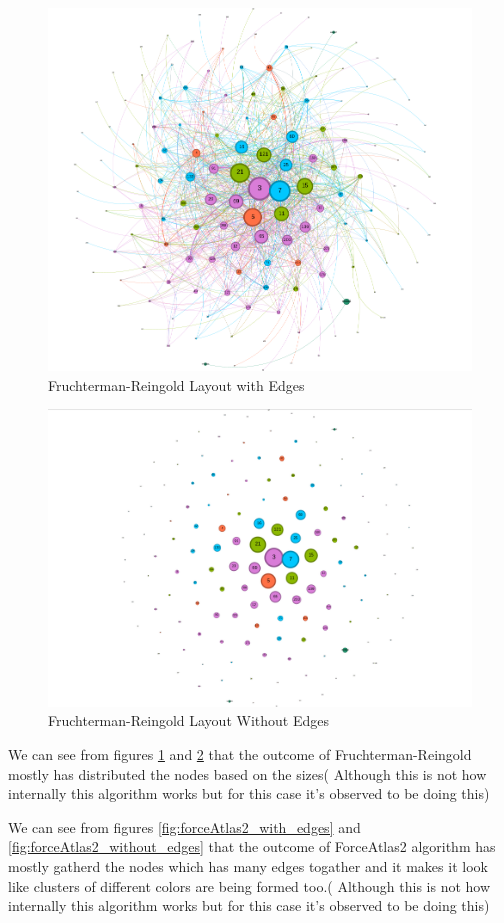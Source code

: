 \documentclass[conference]{IEEEtran}
\begin{document}
\begin{figure}[h]
  \centering
  \includegraphics[width=0.7\linewidth]{./images_ricky/sampled_fruchterman_reingold_withEdges.png}
  \caption{Fruchterman-Reingold Layout with Edges}
  \label{fig:fruchterman_with_edges}
\end{figure}

\begin{figure}[h]
  \centering
  \includegraphics[width=0.7\linewidth]{./images_ricky/sampled_fruchterman_reingold_withoutEdges.png}
  \caption{Fruchterman-Reingold Layout Without Edges}
  \label{fig:fruchterman_without_edges}
\end{figure}


We can see from figures \ref{fig:fruchterman_with_edges} and \ref{fig:fruchterman_without_edges} that the outcome of Fruchterman-Reingold mostly has distributed the nodes based on the sizes( Although this is not how internally this algorithm works but for this case it's observed to be doing this)

We can see from figures \ref{fig:forceAtlas2_with_edges} and \ref{fig:forceAtlas2_without_edges} that the outcome of ForceAtlas2 algorithm has mostly gatherd the nodes which has many edges togather and it makes it look like clusters of different colors are being formed too.( Although this is not how internally this algorithm works but for this case it's observed to be doing this)
\end{document}

